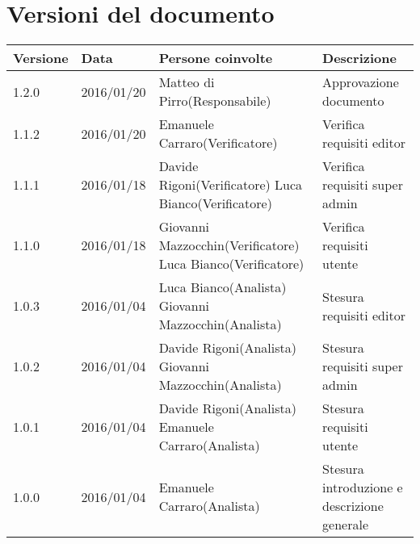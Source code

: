 \section{Versioni del documento}

\begin{center}

\begin{tabular}{| p{1.5cm} | p{2cm} | p{6cm} | p{4.5cm} | }
  \hline
  \textbf{Versione} & \textbf{Data} & \textbf{Persone coinvolte} & \textbf{Descrizione}\\ \hline
  1.2.0 & 2016/01/20 & Matteo di Pirro(Responsabile) & Approvazione documento\\ \hline 
  1.1.2 & 2016/01/20 & Emanuele Carraro(Verificatore) & Verifica requisiti editor\\ \hline 
      1.1.1 & 2016/01/18 & Davide Rigoni(Verificatore) Luca Bianco(Verificatore) & Verifica requisiti super admin\\ \hline
      1.1.0 & 2016/01/18 & Giovanni Mazzocchin(Verificatore) Luca Bianco(Verificatore)& Verifica requisiti utente\\ \hline
      1.0.3 & 2016/01/04 & Luca Bianco(Analista) Giovanni Mazzocchin(Analista) & Stesura requisiti editor\\ \hline
      1.0.2 & 2016/01/04 & Davide Rigoni(Analista) Giovanni Mazzocchin(Analista) & Stesura requisiti super admin\\ \hline
      1.0.1 & 2016/01/04 & Davide Rigoni(Analista) Emanuele Carraro(Analista) & Stesura requisiti utente\\ \hline
      1.0.0 & 2016/01/04 & Emanuele Carraro(Analista) & Stesura introduzione e descrizione generale \\ \hline
\end{tabular}
  
\end{center}